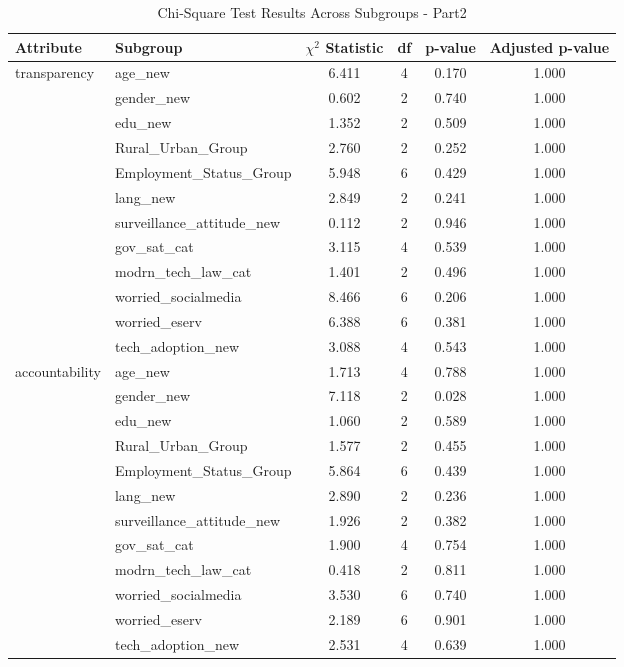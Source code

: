 \begin{table}[h]
\centering
\footnotesize
\begin{tabular}{@{}l l c c c c@{}}
\toprule
Attribute & Subgroup & $\chi^2$ Statistic & df & p-value & Adjusted p-value \\
\midrule
transparency & age\_new & 6.411 & 4 & 0.170 & 1.000 \\
 & gender\_new & 0.602 & 2 & 0.740 & 1.000 \\
 & edu\_new & 1.352 & 2 & 0.509 & 1.000 \\
 & Rural\_Urban\_Group & 2.760 & 2 & 0.252 & 1.000 \\
 & Employment\_Status\_Group & 5.948 & 6 & 0.429 & 1.000 \\
 & lang\_new & 2.849 & 2 & 0.241 & 1.000 \\
 & surveillance\_attitude\_new & 0.112 & 2 & 0.946 & 1.000 \\
 & gov\_sat\_cat & 3.115 & 4 & 0.539 & 1.000 \\
 & modrn\_tech\_law\_cat & 1.401 & 2 & 0.496 & 1.000 \\
 & worried\_socialmedia & 8.466 & 6 & 0.206 & 1.000 \\
 & worried\_eserv & 6.388 & 6 & 0.381 & 1.000 \\
 & tech\_adoption\_new & 3.088 & 4 & 0.543 & 1.000 \\
\midrule
accountability & age\_new & 1.713 & 4 & 0.788 & 1.000 \\
 & gender\_new & 7.118 & 2 & 0.028 & 1.000 \\
 & edu\_new & 1.060 & 2 & 0.589 & 1.000 \\
 & Rural\_Urban\_Group & 1.577 & 2 & 0.455 & 1.000 \\
 & Employment\_Status\_Group & 5.864 & 6 & 0.439 & 1.000 \\
 & lang\_new & 2.890 & 2 & 0.236 & 1.000 \\
 & surveillance\_attitude\_new & 1.926 & 2 & 0.382 & 1.000 \\
 & gov\_sat\_cat & 1.900 & 4 & 0.754 & 1.000 \\
 & modrn\_tech\_law\_cat & 0.418 & 2 & 0.811 & 1.000 \\
 & worried\_socialmedia & 3.530 & 6 & 0.740 & 1.000 \\
 & worried\_eserv & 2.189 & 6 & 0.901 & 1.000 \\
 & tech\_adoption\_new & 2.531 & 4 & 0.639 & 1.000 \\
\midrule
\bottomrule
\end{tabular}
\caption{Chi-Square Test Results Across Subgroups - Part2}
\label{tab:test_results}
\end{table}


